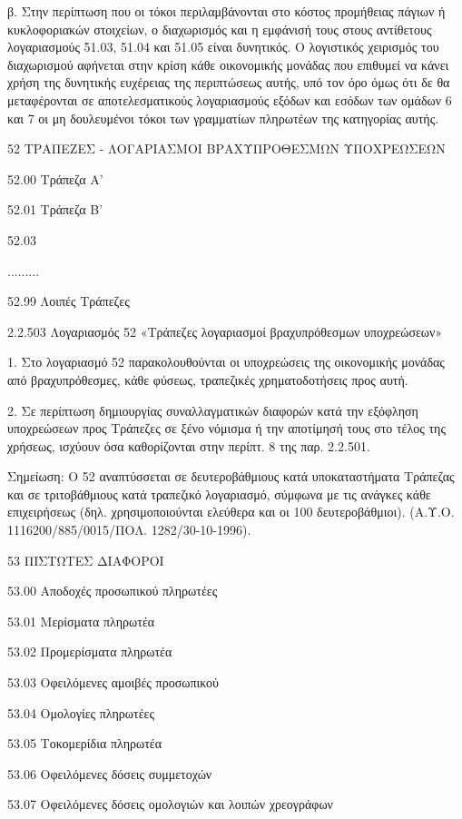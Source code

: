 \documentclass[A4,10pt,greek]{book}
\begin{document}
β. Στην περίπτωση που οι τόκοι περιλαμβάνονται στο κόστος προμήθειας πάγιων ή κυκλοφοριακών στοιχείων, ο διαχωρισμός και η εμφάνισή τους στους αντίθετους λογαριασμούς 51.03, 51.04 και 51.05 είναι δυνητικός. Ο λογιστικός χειρισμός του διαχωρισμού αφήνεται στην κρίση κάθε οικονομικής μονάδας που επιθυμεί να κάνει χρήση της δυνητικής ευχέρειας της περιπτώσεως αυτής, υπό τον όρο όμως ότι δε θα μεταφέρονται σε αποτελεσματικούς λογαριασμούς εξόδων και εσόδων των ομάδων 6 και 7 οι μη δουλευμένοι τόκοι των γραμματίων πληρωτέων της κατηγορίας αυτής.

 52   ΤΡΑΠΕΖΕΣ - ΛΟΓΑΡΙΑΣΜΟΙ ΒΡΑΧΥΠΡΟΘΕΣΜΩΝ ΥΠΟΧΡΕΩΣΕΩΝ

        52.00   Τράπεζα Α'

        52.01   Τράπεζα Β'

        52.03

        .........

        52.99   Λοιπές Τράπεζες

 

2.2.503 Λογαριασμός 52 «Τράπεζες λογαριασμοί βραχυπρόθεσμων υποχρεώσεων»

1. Στο λογαριασμό 52 παρακολουθούνται οι υποχρεώσεις της οικονομικής μονάδας από βραχυπρόθεσμες, κάθε φύσεως, τραπεζικές χρηματοδοτήσεις προς αυτή.

2. Σε περίπτωση δημιουργίας συναλλαγματικών διαφορών κατά την εξόφληση υποχρεώσεων προς Τράπεζες σε ξένο νόμισμα ή την αποτίμησή τους στο τέλος της χρήσεως, ισχύουν όσα καθορίζονται στην περίπτ. 8 της παρ. 2.2.501.

Σημείωση: Ο 52 αναπτύσσεται σε δευτεροβάθμιους κατά υποκαταστήματα Τράπεζας και σε τριτοβάθμιους κατά τραπεζικό λογαριασμό, σύμφωνα με τις ανάγκες κάθε επιχειρήσεως (δηλ. χρησιμοποιούνται ελεύθερα και οι 100 δευτεροβάθμιοι). (Α.Υ.Ο. 1116200/885/0015/ΠΟΛ. 1282/30-10-1996). 

 53   ΠΙΣΤΩΤΕΣ ΔΙΑΦΟΡΟΙ

        53.00   Αποδοχές προσωπικού πληρωτέες

        53.01   Μερίσματα πληρωτέα

        53.02   Προμερίσματα πληρωτέα

        53.03   Οφειλόμενες αμοιβές προσωπικού

        53.04   Ομολογίες πληρωτέες

        53.05   Τοκομερίδια πληρωτέα

        53.06   Οφειλόμενες δόσεις συμμετοχών

        53.07   Οφειλόμενες δόσεις ομολογιών και λοιπών χρεογράφων
\end{document}
